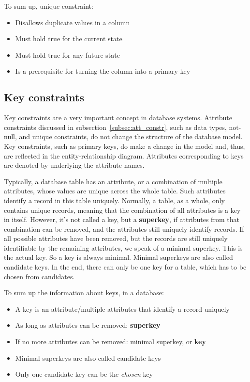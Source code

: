\documentclass[11pt]{article}
\begin{document}
    To sum up, unique constraint:

    \begin{itemize}
        \item Disallows duplicate values in a column
        \item Must hold true for the current state
        \item Must hold true for any future state
        \item Is a prerequisite for turning the column into a primary key
    \end{itemize}

    \subsection{Key constraints} \label{subsec:keys}

    Key constraints are a very important concept in database systems.
    Attribute constraints discussed in subsection~\ref{subsec:att_constr}, such as data types, not-null, and unique constraints, do not change the structure of the database model.
    Key constraints, such as primary keys, do make a change in the model and, thus, are reflected in the entity-relationship diagram.
    Attributes corresponding to keys are denoted by underlying the attribute names.

    Typically, a database table has an attribute, or a combination of multiple attributes, whose values are unique across the whole table.
    Such attributes identify a record in this table uniquely.
    Normally, a table, as a whole, only contains unique records, meaning that the combination of all attributes is a key in itself.
    However, it's not called a key, but a \textbf{superkey},  if attributes from that combination can be removed, and the attributes still uniquely identify records.
    If all possible attributes have been removed, but the records are still uniquely identifiable by the remaining attributes, we speak of a minimal superkey.
    This is the actual key.
    So a key is always minimal.
    Minimal superkeys are also called candidate keys.
    In the end, there can only be one key for a table, which has to be chosen from candidates.

    To sum up the information about keys, in a database:

    \begin{itemize}
        \item A key is an attribute/multiple attributes that identify a record uniquely
        \item As long as attributes can be removed: \textbf{superkey}
        \item If no more attributes can be removed: minimal superkey, or \textbf{key}
        \item Minimal superkeys are also called candidate keys
        \item Only one candidate key can be the \textit{chosen} key
    \end{itemize}
\end{document}
